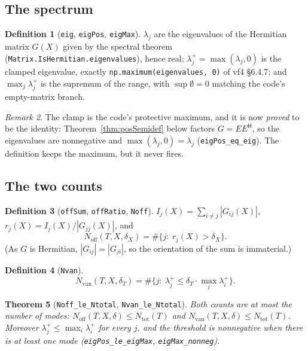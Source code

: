 \documentclass[11pt,a4paper]{article}
\newcommand{\lb}{\_\allowbreak}
\newcommand{\code}[1]{\texttt{#1}}
\newtheorem{theorem}{Theorem}[section]
\theoremstyle{definition}
\newtheorem{definition}[theorem]{Definition}
\theoremstyle{remark}
\newtheorem{remark}[theorem]{Remark}
\begin{document}
\subsection*{The spectrum}

\begin{definition}[\code{eig}, \code{eigPos}, \code{eigMax}]
$\lambda_j$ are the eigenvalues of the Hermitian matrix $G(X)$ given by the spectral theorem
(\code{Matrix.IsHermitian.eigenvalues}), hence real; $\lambda_j^{+}=\max(\lambda_j,0)$ is
the clamped eigenvalue, exactly \code{np.maximum(eigenvalues, 0)} of vf4 \S6.4.7; and
$\max_j\lambda_j^{+}$ is the supremum of the range, with $\sup\emptyset=0$ matching the
code's empty-matrix branch.
\end{definition}

\begin{remark}
The clamp is the code's protective maximum, and it is now \emph{proved} to be the identity:
Theorem~\ref{thm:posSemidef} below factors $G=E E^{\mathsf H}$, so the eigenvalues are
nonnegative and $\max(\lambda_j,0)=\lambda_j$ (\code{eigPos\lb eq\lb eig}).  The definition
keeps the maximum, but it never fires.
\end{remark}

\subsection*{The two counts}

\begin{definition}[\code{offSum}, \code{offRatio}, \code{Noff}]
$I_j(X)=\sum_{i\ne j}|G_{ij}(X)|$, $r_j(X)=I_j(X)/|G_{jj}(X)|$, and
\[
  N_{\mathrm{off}}(T,X,\delta_X)=\#\{j:\ r_j(X)>\delta_X\}.
\]
(As $G$ is Hermitian, $|G_{ij}|=|G_{ji}|$, so the orientation of the sum is immaterial.)
\end{definition}

\begin{definition}[\code{Nvan}]
\[
  N_{\mathrm{van}}(T,X,\delta_T)=\#\{j:\ \lambda_j^{+}\le\delta_T\cdot\max_i\lambda_i^{+}\}.
\]
\end{definition}

\begin{theorem}[\code{Noff\lb le\lb Ntotal}, \code{Nvan\lb le\lb Ntotal}]
Both counts are at most the number of modes: $N_{\mathrm{off}}(T,X,\delta)\le N_{\mathrm{tot}}(T)$
and $N_{\mathrm{van}}(T,X,\delta)\le N_{\mathrm{tot}}(T)$.  Moreover
$\lambda_j^{+}\le\max_i\lambda_i^{+}$ for every $j$, and the threshold is nonnegative when
there is at least one mode (\code{eigPos\lb le\lb eigMax}, \code{eigMax\lb nonneg}).
\end{theorem}
\end{document}
